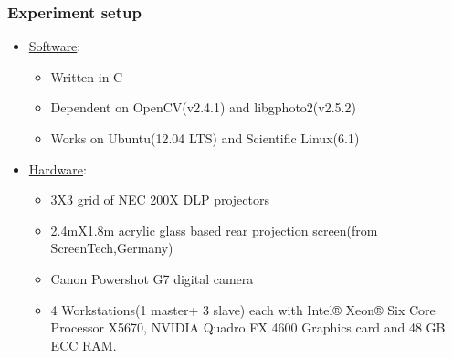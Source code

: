 \documentclass{beamer}
\begin{document}
\begin{frame}[label=sysconfg]
\frametitle{Experiment setup}
\begin{itemize}
\item \underline{Software}:
\begin{itemize}
\item Written in C
\item Dependent on OpenCV(v2.4.1) and libgphoto2(v2.5.2)
\item Works on Ubuntu(12.04 LTS) and Scientific Linux(6.1)
\end{itemize}      
\item \underline{Hardware}:
\begin{itemize}
\item 3X3 grid of NEC 200X DLP projectors
\item 2.4mX1.8m acrylic glass based rear projection screen(from ScreenTech,Germany)
\item Canon Powershot G7 digital camera
\item 4 Workstations(1 master+ 3 slave) each with Intel® Xeon® Six Core Processor X5670, NVIDIA Quadro FX 4600 Graphics card and 48 GB ECC RAM.
\end{itemize}
\end{itemize}
\end{frame}

\end{document}
